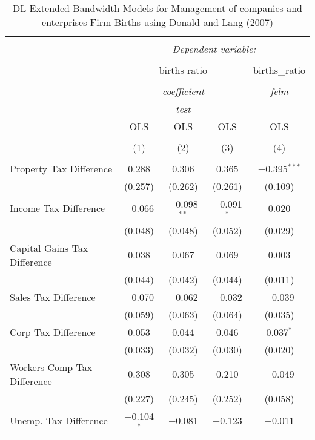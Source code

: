 
\begin{table}[!htbp] \centering 
  \caption{DL Extended Bandwidth Models for  Management of companies and enterprises Firm Births using Donald and Lang (2007)} 
  \label{} 
\begin{tabular}{@{\extracolsep{5pt}}lcccc} 
\\[-1.8ex]\hline 
\hline \\[-1.8ex] 
 & \multicolumn{4}{c}{\textit{Dependent variable:}} \\ 
\cline{2-5} 
\\[-1.8ex] & \multicolumn{3}{c}{births ratio} & births\_ratio \\ 
\\[-1.8ex] & \multicolumn{3}{c}{\textit{coefficient}} & \textit{felm} \\ 
 & \multicolumn{3}{c}{\textit{test}} & \textit{} \\ 
 & OLS & OLS & OLS & OLS \\ 
\\[-1.8ex] & (1) & (2) & (3) & (4)\\ 
\hline \\[-1.8ex] 
 Property Tax Difference & 0.288 & 0.306 & 0.365 & $-$0.395$^{***}$ \\ 
  & (0.257) & (0.262) & (0.261) & (0.109) \\ 
  Income Tax Difference & $-$0.066 & $-$0.098$^{**}$ & $-$0.091$^{*}$ & 0.020 \\ 
  & (0.048) & (0.048) & (0.052) & (0.029) \\ 
  Capital Gains Tax Difference & 0.038 & 0.067 & 0.069 & 0.003 \\ 
  & (0.044) & (0.042) & (0.044) & (0.011) \\ 
  Sales Tax Difference & $-$0.070 & $-$0.062 & $-$0.032 & $-$0.039 \\ 
  & (0.059) & (0.063) & (0.064) & (0.035) \\ 
  Corp Tax Difference & 0.053 & 0.044 & 0.046 & 0.037$^{*}$ \\ 
  & (0.033) & (0.032) & (0.030) & (0.020) \\ 
  Workers Comp Tax Difference & 0.308 & 0.305 & 0.210 & $-$0.049 \\ 
  & (0.227) & (0.245) & (0.252) & (0.058) \\ 
  Unemp. Tax Difference & $-$0.104$^{*}$ & $-$0.081 & $-$0.123 & $-$0.011 \\ 

\end{tabular}
\end{table}
